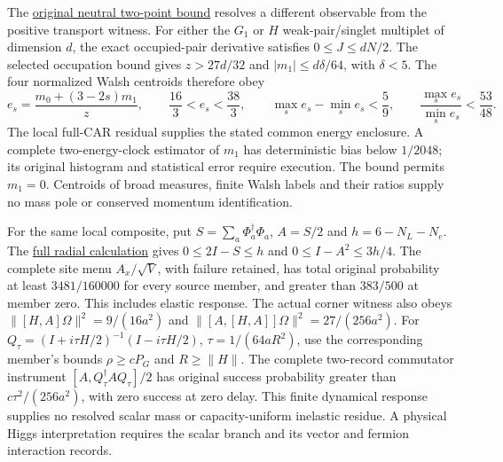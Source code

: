 The \href{https://github.com/FloatingPragma/observer-patch-holography/blob/main/model/particle_candidate_neutral_dispersion/PROOF.md}{original neutral two-point bound}
resolves a different observable from the positive transport witness.
For either the $G_1$ or $H$ weak-pair/singlet multiplet of dimension $d$,
the exact occupied-pair derivative satisfies $0\le J\le dN/2$.
The selected occupation bound gives $z>27d/32$ and
$|m_1|\le d\delta/64$, with $\delta<5$. The four normalized Walsh
centroids therefore obey
\[
 e_s=\frac{m_0+(3-2s)m_1}{z},\qquad
 \frac{16}{3}<e_s<\frac{38}{3},\qquad
 \max_s e_s-\min_s e_s<\frac59,\qquad
 \frac{\max_s e_s}{\min_s e_s}<\frac{53}{48}.
\]
The local full-CAR residual supplies the stated common energy enclosure.
A complete two-energy-clock estimator of $m_1$ has deterministic bias
below $1/2048$; its original histogram and statistical error require
execution. The bound permits $m_1=0$. Centroids of broad measures,
finite Walsh labels and their ratios supply no mass pole or conserved
momentum identification.

For the same local composite, put $S=\sum_a\Phi_a^\dagger\Phi_a$,
$A=S/2$ and $h=6-N_L-N_e$. The
\href{https://github.com/FloatingPragma/observer-patch-holography/blob/main/model/particle_candidate_scalar_gauge_response/PROOF.md}{full radial calculation}
gives $0\le2I-S\le h$ and $0\le I-A^2\le3h/4$.
The complete site menu $A_x/\sqrt V$, with failure retained, has total
original probability at least $3481/160000$ for every source member,
and greater than $383/500$ at member zero. This includes elastic response.
The actual corner witness also obeys
$\|[H,A]\Omega\|^2=9/(16a^2)$ and
$\|[A,[H,A]]\Omega\|^2=27/(256a^2)$.
For $Q_\tau=(I+i\tau H/2)^{-1}(I-i\tau H/2)$,
$\tau=1/(64aR^2)$, use the corresponding member's bounds
$\rho\ge cP_G$ and $R\ge\|H\|$. The complete two-record commutator instrument
$[A,Q_\tau^\dagger A Q_\tau]/2$ has original success probability
greater than $c\tau^2/(256a^2)$, with zero success at zero delay.
This finite dynamical response supplies no resolved scalar mass or
capacity-uniform inelastic residue. A physical Higgs interpretation
requires the scalar branch and its vector and fermion interaction records.

